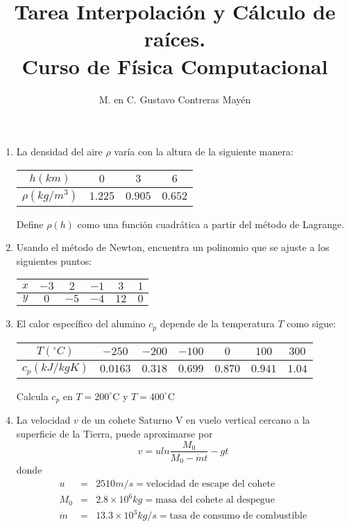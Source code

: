 \documentclass[11pt]{article}
\title{Tarea Interpolaci\'{o}n y C\'{a}lculo de ra\'{i}ces. \\ Curso de F\'{i}sica Computacional}
\author{M. en C. Gustavo Contreras May\'{e}n}
\date{ }
\begin{document}
\maketitle
\fontsize{14}{14}\selectfont
\begin{enumerate}
\item La densidad del aire $\rho$ var\'{i}a con la altura de la siguiente manera:
\begin{table}[H]
\centering \Large
\begin{tabulary}{15cm}{c | c | c | c}
$h (km)$ & $0$ & $3$ & $6$ \\
\midrule $\rho (kg/m^{3})$ & $1.225$ & $0.905$ & $0.652$
\end{tabulary}
\end{table}
Define $\rho(h)$ como una funci\'{o}n cuadr\'{a}tica a partir del m\'{e}todo de Lagrange.
\item Usando el m\'{e}todo de Newton, encuentra un polinomio que se ajuste a los siguientes puntos:
\begin{table}[H]
\centering \Large
\begin{tabulary}{15cm}{c | c | c | c | c | c}
$x$ & $-3$ & $2$ & $-1$ & $3$ & $1$ \\
\midrule $y$ & $0$ & $-5$ & $-4$ & $12$ & $0$
\end{tabulary}
\end{table}
\item El calor espec\'{i}fico del alumino $c_{p}$ depende de la temperatura $T$ como sigue:
\begin{table}[H]
\centering \Large
\begin{tabulary}{15cm}{c | c | c | c | c | c | c}
$T(^{\circ} C)$ & $-250$ & $-200$ & $-100$ & $0$ & $100$ & $300$ \\
\midrule $c_{p} (kJ/kgK)$ & $0.0163$ & $0.318$ & $0.699$ & $0.870$ & $0.941$ & $1.04$
\end{tabulary}
\end{table}
Calcula $c_{p}$ en $T=200^{\circ}$C y $T=400^{\circ}$C
\item La velocidad $v$ de un cohete Saturno V en vuelo vertical cercano a la superficie de la Tierra, puede aproximarse por
\[ v = u ln \dfrac{M_{0}}{M_{0} - \dot{m}t} - gt\]
donde
\begin{eqnarray*}
u &=& 2510 m/s = \text{velocidad de escape del cohete} \\
M_{0} &=& 2.8 \times 10^{6} kg = \text{masa del cohete al despegue} \\
\dot{m} &=& 13.3 \times 10^{3} kg/s = \text{tasa de consumo de combustible} \\ 

\end{eqnarray*}
\end{enumerate}
\end{document}
